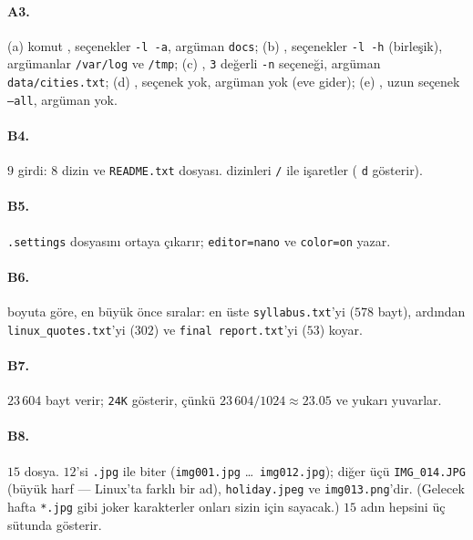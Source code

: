 \paragraph{A3.} (a) komut , seçenekler \texttt{-l -a}, argüman \texttt{docs}; (b) , seçenekler \texttt{-l -h} (birleşik), argümanlar \texttt{/var/log} ve \texttt{/tmp}; (c) , \texttt{3} değerli \texttt{-n} seçeneği, argüman \texttt{data/cities.txt}; (d) , seçenek yok, argüman yok (eve gider); (e) , uzun seçenek \texttt{--all}, argüman yok.

\paragraph{B4.} $9$ girdi: $8$ dizin ve \texttt{README.txt} dosyası.  dizinleri \texttt{/} ile işaretler ( \texttt{d} gösterir).

\paragraph{B5.}  \texttt{.settings} dosyasını ortaya çıkarır;  \texttt{editor=nano} ve \texttt{color=on} yazar.

\paragraph{B6.}  boyuta göre, en büyük önce sıralar:  en üste \texttt{syllabus.txt}'yi ($578$ bayt), ardından \texttt{linux\_quotes.txt}'yi ($302$) ve \texttt{final report.txt}'yi ($53$) koyar.

\paragraph{B7.}  $23\,604$ bayt verir;  \texttt{24K} gösterir, çünkü $23\,604/1024 \approx 23.05$ ve  yukarı yuvarlar.

\paragraph{B8.} $15$ dosya. $12$'si \texttt{.jpg} ile biter (\texttt{img001.jpg} \ldots\ \texttt{img012.jpg}); diğer üçü \texttt{IMG\_014.JPG} (büyük harf --- Linux'ta farklı bir ad), \texttt{holiday.jpeg} ve \texttt{img013.png}'dir. (Gelecek hafta \texttt{*.jpg} gibi joker karakterler onları sizin için sayacak.)  $15$ adın hepsini üç sütunda gösterir.

